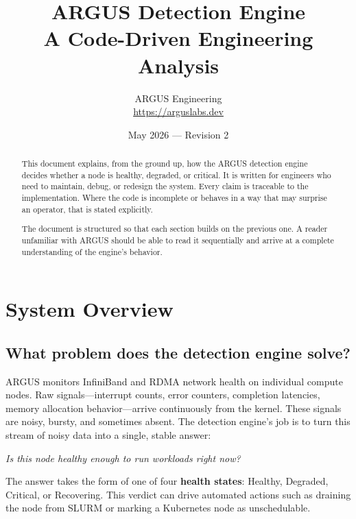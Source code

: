 \documentclass[11pt]{article}
\title{ARGUS Detection Engine\\\large A Code-Driven Engineering Analysis}
\author{ARGUS Engineering\\\small\url{https://arguslabs.dev}}
\date{May 2026 --- Revision 2}
\begin{document}
\maketitle

\begin{abstract}
This document explains, from the ground up, how the ARGUS detection engine
decides whether a node is healthy, degraded, or critical. It is written for
engineers who need to maintain, debug, or redesign the system. Every claim is
traceable to the implementation. Where the code is incomplete or behaves in a
way that may surprise an operator, that is stated explicitly.

The document is structured so that each section builds on the previous one.
A reader unfamiliar with ARGUS should be able to read it sequentially and
arrive at a complete understanding of the engine's behavior.
\end{abstract}

\tableofcontents
\newpage

\section{System Overview}
\label{sec:overview}

\subsection{What problem does the detection engine solve?}

ARGUS monitors InfiniBand and RDMA network health on individual compute nodes.
Raw signals---interrupt counts, error counters, completion latencies, memory
allocation behavior---arrive continuously from the kernel. These signals are
noisy, bursty, and sometimes absent. The detection engine's job is to turn this
stream of noisy data into a single, stable answer:

\begin{center}
\emph{Is this node healthy enough to run workloads right now?}
\end{center}

The answer takes the form of one of four \textbf{health states}: Healthy,
Degraded, Critical, or Recovering. This verdict can drive automated actions
such as draining the node from SLURM or marking a Kubernetes node as
unschedulable.
\end{document}
